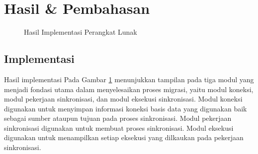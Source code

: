 \section{Hasil \& Pembahasan}
\label{sec:hasil}


\begin{figure}
  \centering
  \hfil
  \hfil
  \hfil
  \caption{Hasil Implementasi Perangkat Lunak}
  \label{fig:hasil}
\end{figure}

\subsection{Implementasi}
Hasil implementasi Pada Gambar \ref{fig:hasil} menunjukkan tampilan pada tiga modul yang menjadi 
fondasi utama dalam menyelesaikan proses migrasi, yaitu modul koneksi, modul pekerjaan sinkronisasi, dan modul eksekusi sinkronisasi. Modul koneksi digunakan untuk menyimpan informasi koneksi basis data yang digunakan baik sebagai sumber ataupun tujuan pada proses sinkronisasi. Modul pekerjaan sinkronisasi digunakan untuk membuat proses sinkronisasi. Modul eksekusi digunakan untuk menampilkan setiap eksekusi yang dilkaukan pada pekerjaan sinkronisasi. 

